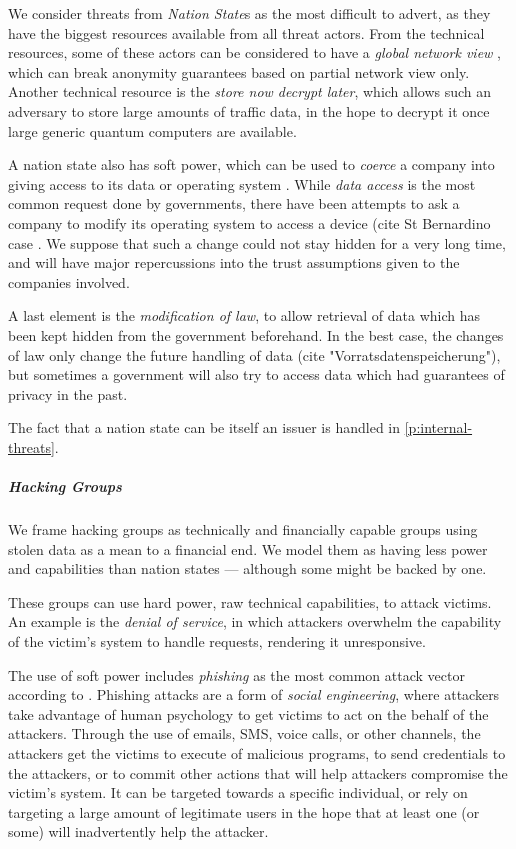 We consider threats from \emph{Nation State}s as the most difficult to advert, as they have
the biggest resources available from all threat actors.
From the technical resources, some of these actors can be considered to have a \emph{global network view}
\cite{TorAttack}, which can break anonymity guarantees based on partial network view only.
Another technical resource is the \emph{store now decrypt later}, which allows such an adversary
to store large amounts of traffic data, in the hope to decrypt it once large generic quantum computers
are available.

A nation state also has soft power, which can be used to \emph{coerce} a company into giving
access to its data or operating system \cite{TelegramArrest}\cite{ProtonLogging}.
While \emph{data access} is the most common request done by governments, there have been attempts
to ask a company to modify its operating system to access a device (cite St Bernardino case
\cite{AppleSanBernardino}.
We suppose that such a change could not stay hidden for a very long time, and will have major
repercussions into the trust assumptions given to the companies involved.

A last element is the \emph{modification of law}, to allow retrieval of data which has been
kept hidden from the government beforehand.
In the best case, the changes of law only change the future handling of data (cite
"Vorratsdatenspeicherung"), but sometimes a government will also try to access
data which had guarantees of privacy in the past.

The fact that a nation state can be itself an issuer is handled in \ref{p:internal-threats}.

\subparagraph{Hacking Groups}

We frame hacking groups as technically and financially capable groups using stolen data as a mean to a financial end.
We model them as having less power and capabilities than nation states --- although some might be backed by one.

These groups can use hard power, raw technical capabilities, to attack victims. 
An example is the \emph{denial of service}, in which attackers
overwhelm the capability of the victim's system to handle requests, rendering it unresponsive.

The use of soft power includes \emph{phishing} as the most common attack vector according to \cite{IC3-24}.
Phishing attacks are a form of \emph{social engineering}, where attackers take advantage of human psychology to get victims to act on the behalf of the attackers.
Through the use of emails, SMS, voice calls, or other channels, the attackers get the victims to execute of malicious programs, to send credentials to the attackers, or to commit other actions that will help attackers compromise the victim's system.
It can be targeted towards a specific individual, or rely on targeting a large amount of legitimate users in the hope that at least one (or some) will inadvertently help the attacker.


